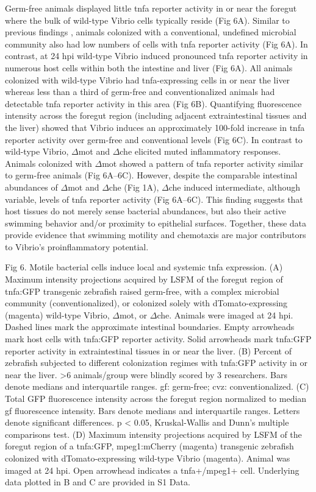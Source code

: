 Germ-free animals displayed little tnfa reporter activity in or near the foregut where the bulk of wild-type Vibrio cells typically reside (Fig 6A). Similar to previous findings \cite{marjoram_epigenetic_2015}, animals colonized with a conventional, undefined microbial community also had low numbers of cells with tnfa reporter activity (Fig 6A). In contrast, at 24 hpi wild-type Vibrio induced pronounced tnfa reporter activity in numerous host cells within both the intestine and liver (Fig 6A). All animals colonized with wild-type Vibrio had tnfa-expressing cells in or near the liver whereas less than a third of germ-free and conventionalized animals had detectable tnfa reporter activity in this area (Fig 6B). Quantifying fluorescence intensity across the foregut region (including adjacent extraintestinal tissues and the liver) showed that Vibrio induces an approximately 100-fold increase in tnfa reporter activity over germ-free and conventional levels (Fig 6C). In contrast to wild-type Vibrio, $\Delta$mot and $\Delta$che elicited muted inflammatory responses. Animals colonized with $\Delta$mot showed a pattern of tnfa reporter activity similar to germ-free animals (Fig 6A–6C). However, despite the comparable intestinal abundances of $\Delta$mot and $\Delta$che (Fig 1A), $\Delta$che induced intermediate, although variable, levels of tnfa reporter activity (Fig 6A–6C). This finding suggests that host tissues do not merely sense bacterial abundances, but also their active swimming behavior and/or proximity to epithelial surfaces. Together, these data provide evidence that swimming motility and chemotaxis are major contributors to Vibrio's proinflammatory potential. 

Fig 6. Motile bacterial cells induce local and systemic tnfa expression.
(A) Maximum intensity projections acquired by LSFM of the foregut region of tnfa:GFP transgenic zebrafish raised germ-free, with a complex microbial community (conventionalized), or colonized solely with dTomato-expressing (magenta) wild-type Vibrio, $\Delta$mot, or $\Delta$che. Animals were imaged at 24 hpi. Dashed lines mark the approximate intestinal boundaries. Empty arrowheads mark host cells with tnfa:GFP reporter activity. Solid arrowheads mark tnfa:GFP reporter activity in extraintestinal tissues in or near the liver. (B) Percent of zebrafish subjected to different colonization regimes with tnfa:GFP activity in or near the liver. >6 animals/group were blindly scored by 3 researchers. Bars denote medians and interquartile ranges. gf: germ-free; cvz: conventionalized. (C) Total GFP fluorescence intensity across the foregut region normalized to median gf fluorescence intensity. Bars denote medians and interquartile ranges. Letters denote significant differences. p < 0.05, Kruskal-Wallis and Dunn's multiple comparisons test. (D) Maximum intensity projections acquired by LSFM of the foregut region of a tnfa:GFP, mpeg1:mCherry (magenta) transgenic zebrafish colonized with dTomato-expressing wild-type Vibrio (magenta). Animal was imaged at 24 hpi. Open arrowhead indicates a tnfa+/mpeg1+ cell. Underlying data plotted in B and C are provided in S1 Data.

